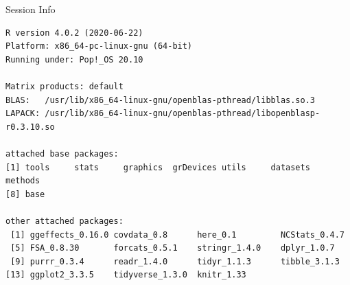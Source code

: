 \documentclass[10pt]{beamer}\usepackage[]{graphicx}\usepackage[]{color}
\makeatletter
\newenvironment{kframe}{%
 \def\at@end@of@kframe{}%
 \ifinner\ifhmode%
  \def\at@end@of@kframe{\end{minipage}}%
  \begin{minipage}{\columnwidth}%
 \fi\fi%
 \def\FrameCommand##1{\hskip\@totalleftmargin \hskip-\fboxsep
 \colorbox{shadecolor}{##1}\hskip-\fboxsep
     \hskip-\linewidth \hskip-\@totalleftmargin \hskip\columnwidth}%
 \MakeFramed {\advance\hsize-\width
   \@totalleftmargin\z@ \linewidth\hsize
   \@setminipage}}%
 {\par\unskip\endMakeFramed%
 \at@end@of@kframe}
\newenvironment{knitrout}{}{} %
\makeatother
\begin{document}


\begin{frame}[fragile]{Session Info}
	\tiny
	
\begin{knitrout}\tiny
{}\color{fgcolor}\begin{kframe}
\begin{verbatim}
R version 4.0.2 (2020-06-22)
Platform: x86_64-pc-linux-gnu (64-bit)
Running under: Pop!_OS 20.10

Matrix products: default
BLAS:   /usr/lib/x86_64-linux-gnu/openblas-pthread/libblas.so.3
LAPACK: /usr/lib/x86_64-linux-gnu/openblas-pthread/libopenblasp-r0.3.10.so

attached base packages:
[1] tools     stats     graphics  grDevices utils     datasets  methods  
[8] base     

other attached packages:
 [1] ggeffects_0.16.0 covdata_0.8      here_0.1         NCStats_0.4.7   
 [5] FSA_0.8.30       forcats_0.5.1    stringr_1.4.0    dplyr_1.0.7     
 [9] purrr_0.3.4      readr_1.4.0      tidyr_1.1.3      tibble_3.1.3    
[13] ggplot2_3.3.5    tidyverse_1.3.0  knitr_1.33      


\end{verbatim}
\end{kframe}
\end{knitrout}
\end{frame}
\end{document}
